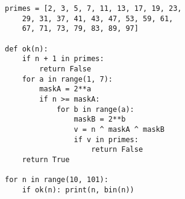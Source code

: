 \documentclass[a4paper,10pt,twocolumn]{article}
\begin{document}
\begin{verbatim}
primes = [2, 3, 5, 7, 11, 13, 17, 19, 23,
    29, 31, 37, 41, 43, 47, 53, 59, 61,
    67, 71, 73, 79, 83, 89, 97]

def ok(n):
    if n + 1 in primes: 
        return False
    for a in range(1, 7):
        maskA = 2**a
        if n >= maskA:
            for b in range(a):
                maskB = 2**b
                v = n ^ maskA ^ maskB
                if v in primes: 
                    return False
    return True

for n in range(10, 101):
    if ok(n): print(n, bin(n))
\end{verbatim}
\end{document}

